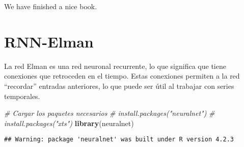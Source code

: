 \documentclass[
]{book}
\newenvironment{Shaded}{\begin{snugshade}}{\end{snugshade}}
\newcommand{\CommentTok}[1]{\textcolor[rgb]{0.56,0.35,0.01}{\textit{#1}}}
\newcommand{\FunctionTok}[1]{\textcolor[rgb]{0.13,0.29,0.53}{\textbf{#1}}}
\newcommand{\NormalTok}[1]{#1}
\begin{document}
We have finished a nice book.

\hypertarget{rnn-elman}{%
\chapter{RNN-Elman}\label{rnn-elman}}

La red Elman es una red neuronal recurrente, lo que significa que tiene conexiones que retroceden en el tiempo. Estas conexiones permiten a la red ``recordar'' entradas anteriores, lo que puede ser útil al trabajar con series temporales.

\begin{Shaded}
\begin{Highlighting}[]
\CommentTok{\# Cargar los paquetes necesarios}
\CommentTok{\# install.packages("neuralnet")}
\CommentTok{\# install.packages("xts")}
\FunctionTok{library}\NormalTok{(neuralnet)}
\end{Highlighting}
\end{Shaded}

\begin{verbatim}
## Warning: package 'neuralnet' was built under R version 4.2.3
\end{verbatim}
\end{document}
